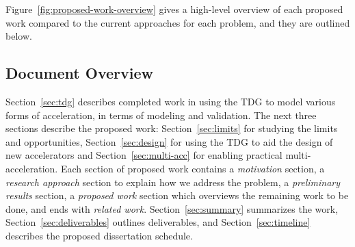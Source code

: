 Figure~\ref{fig:proposed-work-overview} gives a high-level overview of each
proposed work compared to the current approaches for each problem, 
and they are outlined below.

\subsection{Document Overview}

Section~\ref{sec:tdg} describes completed work in using the TDG to model various forms of
acceleration, in terms of modeling and validation.  The next three sections
describe the proposed work: Section~\ref{sec:limits} for studying the limits
and opportunities, Section~\ref{sec:design} for using the TDG to aid the design
of new accelerators and Section~\ref{sec:multi-acc} for enabling practical
multi-acceleration.  Each section of proposed work contains a \emph{motivation}
section, a \emph{research approach} section to explain how we address the problem,
a \emph{preliminary results} section, a \emph{proposed work} section 
which overviews the remaining work to be done, and ends with \emph{related work}.
Section~\ref{sec:summary} summarizes the work, 
Section~\ref{sec:deliverables} outlines deliverables,
and Section~\ref{sec:timeline} describes the proposed dissertation schedule.


